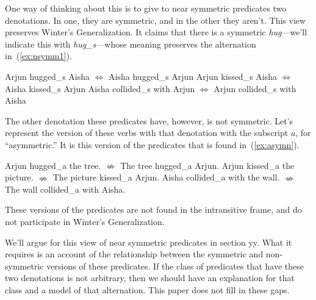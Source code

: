 \documentclass[twoside, 12pt]{article}
\begin{document}
One way of thinking about this is to give to near symmetric predicates two denotations. In one, they are symmetric, and in the other they aren't. This view preserves Winter's Generalization. It claims that there is a symmetric \textit{hug}---we'll indicate this with \textit{hug_s}---whose meaning preserves the alternation in~(\ref{ex:nsymm1}).
\begin{exe}
\raggedright
  \ex \label{ex:nsymm1}
  \begin{xlist}
    \ex Arjun hugged_s Aisha $\Leftrightarrow$ Aisha hugged_s Arjun
    \ex Arjun kissed_s Aisha $\Leftrightarrow$ Aisha kissed_s Arjun
    \ex Aisha collided_s with Arjun $\Leftrightarrow$ Arjun collided_s with Aisha
  \end{xlist}
\end{exe}
The other denotation these predicates have, however, is not symmetric. Let's represent the version of these verbs with that denotation with the subscript $a$, for ``asymmetric.'' It is this version of the predicates that is found in~(\ref{ex:asymn}).
\begin{exe}
\raggedright
  \ex \label{ex:asymn}
  \begin{xlist}
    \ex Arjun hugged_a the tree. $\nLeftrightarrow$ The tree hugged_a Arjun.
    \ex Arjun kissed_a the picture. $\nLeftrightarrow$ The picture kissed_a Arjun.
    \ex Aisha collided_a with the wall. $\nLeftrightarrow$ The wall collided_a with Aisha.
  \end{xlist}
\end{exe}
These versions of the predicates are not found in the intransitive frame, and do not participate in Winter's Generalization.
\begin{exe}
\raggedright
  \ex \label{ex:asymns}
  \begin{xlist}
  \end{xlist}
\end{exe}

We'll argue for this view of near symmetric predicates in section yy. What it requires is an account of the relationship between the symmetric and non-symmetric versions of these predicates. If the class of predicates that have these two denotations is not arbitrary, then we should have an explanation for that class and a model of that alternation. This paper does not fill in these gaps.
\end{document}
